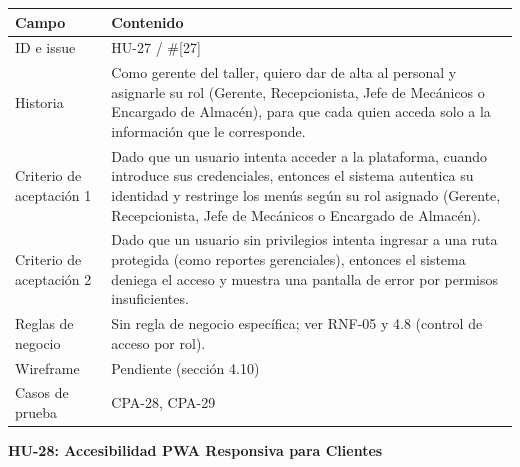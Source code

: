 {\def\LTcaptype{none} %
\begin{longtable}[]{@{}
  >{\raggedright\arraybackslash}p{}
  >{\raggedright\arraybackslash}p{}@{}}
\toprule\noalign{}
\begin{minipage}[b]{\linewidth}\raggedright
\textbf{Campo}
\end{minipage} & \begin{minipage}[b]{\linewidth}\raggedright
\textbf{Contenido}
\end{minipage} \\
\midrule\noalign{}
\endhead
\bottomrule\noalign{}
\endlastfoot
ID e issue & HU-27 / \#{[}27{]} \\
Historia & Como gerente del taller, quiero dar de alta al personal y
asignarle su rol (Gerente, Recepcionista, Jefe de Mecánicos o Encargado
de Almacén), para que cada quien acceda solo a la información que le
corresponde. \\
Criterio de aceptación 1 & Dado que un usuario intenta acceder a la
plataforma, cuando introduce sus credenciales, entonces el sistema
autentica su identidad y restringe los menús según su rol asignado
(Gerente, Recepcionista, Jefe de Mecánicos o Encargado de Almacén). \\
Criterio de aceptación 2 & Dado que un usuario sin privilegios intenta
ingresar a una ruta protegida (como reportes gerenciales), entonces el
sistema deniega el acceso y muestra una pantalla de error por permisos
insuficientes. \\
Reglas de negocio & Sin regla de negocio específica; ver RNF-05 y 4.8
(control de acceso por rol). \\
Wireframe & Pendiente (sección 4.10) \\
Casos de prueba & CPA-28, CPA-29 \\
\end{longtable}
}

\textbf{HU-28: Accesibilidad PWA Responsiva para Clientes}

